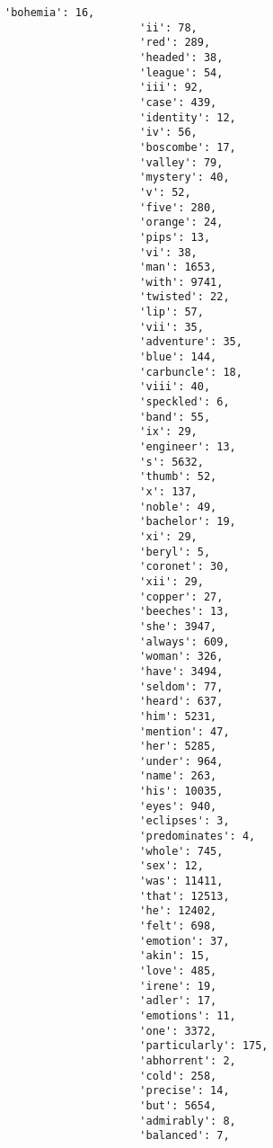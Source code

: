 \documentclass[11pt]{article}
\begin{document}
\begin{Verbatim}[commandchars=\\\{\}]
                     'bohemia': 16,
                     'ii': 78,
                     'red': 289,
                     'headed': 38,
                     'league': 54,
                     'iii': 92,
                     'case': 439,
                     'identity': 12,
                     'iv': 56,
                     'boscombe': 17,
                     'valley': 79,
                     'mystery': 40,
                     'v': 52,
                     'five': 280,
                     'orange': 24,
                     'pips': 13,
                     'vi': 38,
                     'man': 1653,
                     'with': 9741,
                     'twisted': 22,
                     'lip': 57,
                     'vii': 35,
                     'adventure': 35,
                     'blue': 144,
                     'carbuncle': 18,
                     'viii': 40,
                     'speckled': 6,
                     'band': 55,
                     'ix': 29,
                     'engineer': 13,
                     's': 5632,
                     'thumb': 52,
                     'x': 137,
                     'noble': 49,
                     'bachelor': 19,
                     'xi': 29,
                     'beryl': 5,
                     'coronet': 30,
                     'xii': 29,
                     'copper': 27,
                     'beeches': 13,
                     'she': 3947,
                     'always': 609,
                     'woman': 326,
                     'have': 3494,
                     'seldom': 77,
                     'heard': 637,
                     'him': 5231,
                     'mention': 47,
                     'her': 5285,
                     'under': 964,
                     'name': 263,
                     'his': 10035,
                     'eyes': 940,
                     'eclipses': 3,
                     'predominates': 4,
                     'whole': 745,
                     'sex': 12,
                     'was': 11411,
                     'that': 12513,
                     'he': 12402,
                     'felt': 698,
                     'emotion': 37,
                     'akin': 15,
                     'love': 485,
                     'irene': 19,
                     'adler': 17,
                     'emotions': 11,
                     'one': 3372,
                     'particularly': 175,
                     'abhorrent': 2,
                     'cold': 258,
                     'precise': 14,
                     'but': 5654,
                     'admirably': 8,
                     'balanced': 7,

\end{Verbatim}
\end{document}
